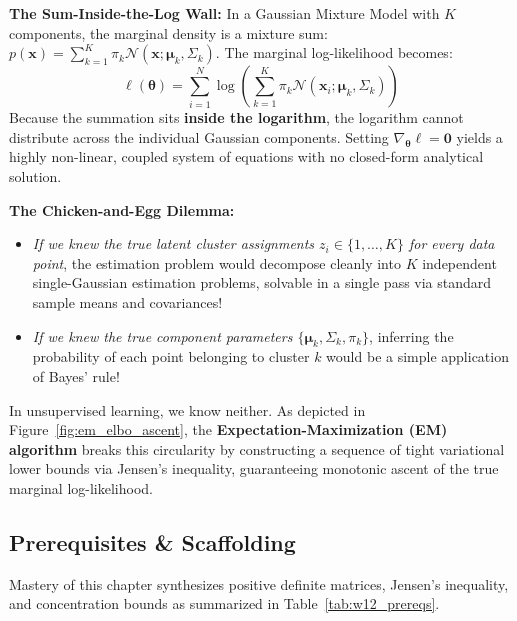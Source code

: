 \textbf{The Sum-Inside-the-Log Wall:} In a Gaussian Mixture Model with $K$ components, the marginal density is a mixture sum: $p(\mathbf{x}) = \sum_{k=1}^K \pi_k \mathcal{N}(\mathbf{x}; \boldsymbol{\mu}_k, \Sigma_k)$. The marginal log-likelihood becomes:
\begin{equation}
\ell(\boldsymbol{\theta}) = \sum_{i=1}^N \log\left( \sum_{k=1}^K \pi_k \mathcal{N}(\mathbf{x}_i; \boldsymbol{\mu}_k, \Sigma_k) \right)
\end{equation}
Because the summation sits \textbf{inside the logarithm}, the logarithm cannot distribute across the individual Gaussian components. Setting $\nabla_{\boldsymbol{\theta}} \ell = \mathbf{0}$ yields a highly non-linear, coupled system of equations with no closed-form analytical solution.

\textbf{The Chicken-and-Egg Dilemma:}
\begin{itemize}
    \item \emph{If we knew the true latent cluster assignments $z_i \in \{1, \dots, K\}$ for every data point}, the estimation problem would decompose cleanly into $K$ independent single-Gaussian estimation problems, solvable in a single pass via standard sample means and covariances!
    \item \emph{If we knew the true component parameters $\{\boldsymbol{\mu}_k, \Sigma_k, \pi_k\}$}, inferring the probability of each point belonging to cluster $k$ would be a simple application of Bayes' rule!
\end{itemize}
In unsupervised learning, we know neither. As depicted in Figure~\ref{fig:em_elbo_ascent}, the \textbf{Expectation-Maximization (EM) algorithm} breaks this circularity by constructing a sequence of tight variational lower bounds via Jensen's inequality, guaranteeing monotonic ascent of the true marginal log-likelihood.

\subsection{Prerequisites \& Scaffolding}
Mastery of this chapter synthesizes positive definite matrices, Jensen's inequality, and concentration bounds as summarized in Table~\ref{tab:w12_prereqs}.


